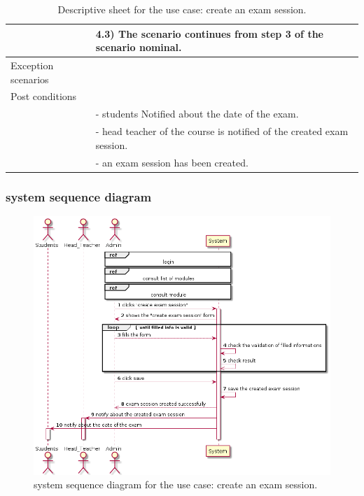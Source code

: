 \documentclass[]{uc2pfecaneva}
\begin{document}
\begin{table}[h]
\begin{tabularx}{\textwidth}{|l|X|}
		& \hspace{4mm}4.3) The scenario continues from step 3 of the scenario nominal.                                                                                      \\ \hline
		Exception scenarios   &                                                                                                                                                                   \\ \hline
		Post conditions       &                                                                                                                                                                   \\
		& - students Notified about the date of the exam.                                                                                                                   \\
		& - head teacher of the course is notified of the created exam session.                                                                                             \\
		& - an exam session has been created.                                                                                                                               \\ \hline
	\end{tabularx}
	\caption{Descriptive sheet for the use case: create an exam session.}
	\label{table:2}
\end{table}
\clearpage

\subsubsection{system sequence diagram}
\begin{figure}[h]
	
	\centering
	\includegraphics[width=\textwidth]{images/create_exam_session}
	
	\caption{system sequence diagram for the use case: create an exam session.}
\end{figure}
\clearpage
\end{document}
